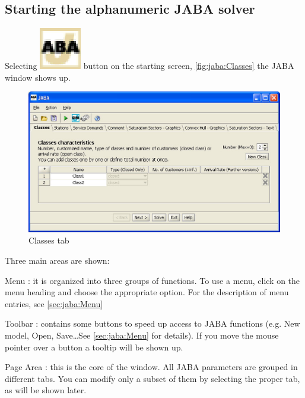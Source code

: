\subsection{Starting the alphanumeric JABA solver}
Selecting \includegraphics[scale=.5]{img/JABAIcon} button on the
starting screen, \autoref{fig:jaba:Classes} the JABA window shows up.
\begin{figure}[htbp]
    \begin{center}
        \includegraphics[scale=.5]{img/jaba/classes}
    \end{center}
    \caption{Classes tab}
    \label{fig:jaba:Classes}
\end{figure}

Three main areas are shown:
\begin{description*}
\item[Menu :] it is organized into three groups of functions. To use a
menu, click on the menu heading and choose the appropriate option.
For the description of menu entries, see \autoref{sec:jaba:Menu}
\item[Toolbar :] contains some buttons to speed up access to JABA functions
(e.g. New model, Open, Save\dots See \autoref{sec:jaba:Menu} for
details). If you move the mouse pointer over a button a tooltip will
be shown up.
\item[Page Area :] this is the core of the window. All JABA parameters are grouped in
different tabs. You can modify only a subset of them by selecting
the proper tab, as will be shown later.
\end{description*}

